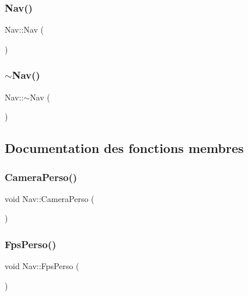 \subsubsection{\texorpdfstring{Nav()}{Nav()}}
{\footnotesize\ttfamily Nav\+::\+Nav (\begin{DoxyParamCaption}{ }\end{DoxyParamCaption})}

\mbox{\label{class_nav_a8a16a4104858c5c76ab490157d77bc29}} 
\subsubsection{\texorpdfstring{$\sim$\+Nav()}{~Nav()}}
{\footnotesize\ttfamily Nav\+::$\sim$\+Nav (\begin{DoxyParamCaption}{ }\end{DoxyParamCaption})}



\subsection{Documentation des fonctions membres}
\mbox{\label{class_nav_a993a0ca0a3bedb5c5d8717edad632bfb}} 
\subsubsection{\texorpdfstring{Camera\+Perso()}{CameraPerso()}}
{\footnotesize\ttfamily void Nav\+::\+Camera\+Perso (\begin{DoxyParamCaption}{ }\end{DoxyParamCaption})}

\mbox{\label{class_nav_ac9460667c27ef1258d96ac8468cf61d8}} 
\subsubsection{\texorpdfstring{Fps\+Perso()}{FpsPerso()}}
{\footnotesize\ttfamily void Nav\+::\+Fps\+Perso (\begin{DoxyParamCaption}{ }\end{DoxyParamCaption})}



